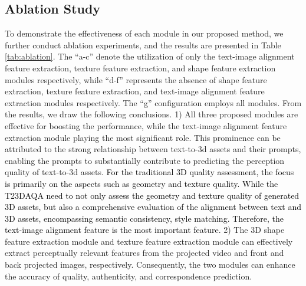 \vspace{-13pt}
\subsection{Ablation Study}
To demonstrate the effectiveness of each module in our proposed method, we further conduct ablation experiments, and the results are presented in Table \ref{tab:ablation}. The ``a-c'' denote the utilization of only the text-image alignment feature extraction, texture feature extraction, and shape feature extraction modules respectively, while ``d-f'' represents the absence of shape feature extraction, texture feature extraction, and text-image alignment feature extraction modules respectively. The ``g'' configuration employs all modules. From the results, we draw the following conclusions. 1) All three proposed modules are effective for boosting the performance, while the text-image alignment feature extraction module playing the most significant role. This prominence can be attributed to the strong relationship between text-to-3d assets and their prompts, enabling the prompts to substantially contribute to predicting the perception quality of text-to-3d assets. \textcolor{black}{For the traditional 3D quality assessment, the focus is primarily on the aspects such as geometry and texture quality. While the T23DAQA need to not only assess the geometry and texture quality of generated 3D assets, but also a comprehensive evaluation of the alignment between text and 3D assets, encompassing semantic consistency, style matching. Therefore, the text-image alignment feature is the most important feature.} 2) The 3D shape feature extraction module and texture feature extraction module can effectively extract perceptually relevant features from the projected video and front and back projected images, respectively. Consequently, the two modules can enhance the accuracy of quality, authenticity, and correspondence prediction.
\vspace{-13pt}



